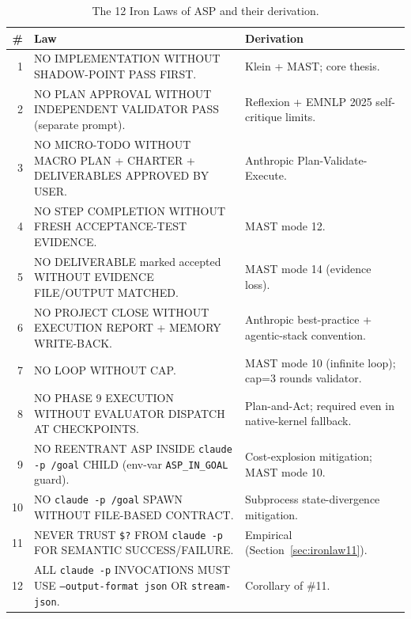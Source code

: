 \documentclass[11pt, a4paper]{article}
\begin{document}
\begin{table}[ht]
\centering
\footnotesize
\caption{The 12 Iron Laws of ASP and their derivation.}
\label{tab:ironlaws}
\begin{tabular}{rp{8cm}p{4cm}}
\toprule
\textbf{\#} & \textbf{Law} & \textbf{Derivation} \\
\midrule
1  & NO IMPLEMENTATION WITHOUT SHADOW-POINT PASS FIRST. & Klein + MAST; core thesis. \\
2  & NO PLAN APPROVAL WITHOUT INDEPENDENT VALIDATOR PASS (separate prompt). & Reflexion + EMNLP 2025 self-critique limits. \\
3  & NO MICRO-TODO WITHOUT MACRO PLAN + CHARTER + DELIVERABLES APPROVED BY USER. & Anthropic Plan-Validate-Execute. \\
4  & NO STEP COMPLETION WITHOUT FRESH ACCEPTANCE-TEST EVIDENCE. & MAST mode 12. \\
5  & NO DELIVERABLE marked accepted WITHOUT EVIDENCE FILE/OUTPUT MATCHED. & MAST mode 14 (evidence loss). \\
6  & NO PROJECT CLOSE WITHOUT EXECUTION REPORT + MEMORY WRITE-BACK. & Anthropic best-practice + agentic-stack convention. \\
7  & NO LOOP WITHOUT CAP. & MAST mode 10 (infinite loop); cap=3 rounds validator. \\
8  & NO PHASE 9 EXECUTION WITHOUT EVALUATOR DISPATCH AT CHECKPOINTS. & Plan-and-Act; required even in native-kernel fallback. \\
9  & NO REENTRANT ASP INSIDE \texttt{claude -p /goal} CHILD (env-var \texttt{ASP\_IN\_GOAL} guard). & Cost-explosion mitigation; MAST mode 10. \\
10 & NO \texttt{claude -p /goal} SPAWN WITHOUT FILE-BASED CONTRACT. & Subprocess state-divergence mitigation. \\
11 & NEVER TRUST \texttt{\$?} FROM \texttt{claude -p} FOR SEMANTIC SUCCESS/FAILURE. & Empirical (Section~\ref{sec:ironlaw11}). \\
12 & ALL \texttt{claude -p} INVOCATIONS MUST USE \texttt{--output-format json} OR \texttt{stream-json}. & Corollary of \#11. \\
\bottomrule
\end{tabular}
\end{table}
\end{document}
